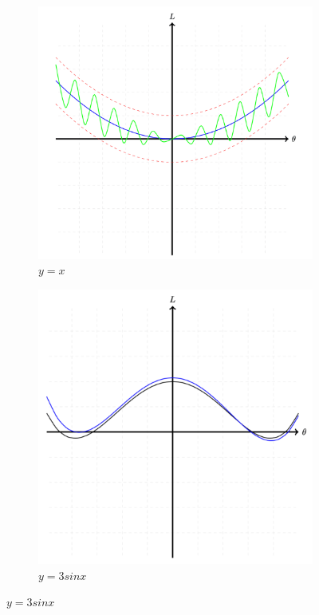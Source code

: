 \documentclass{article}
\begin{document}
\begin{figure}
     \centering
     \begin{subfigure}[b]{0.47\textwidth}
         \centering
         \includegraphics[width=\textwidth]{Figs/1.png}
         \caption{$y=x$}
         \label{fig:1}
     \end{subfigure}
     \hfill
     \begin{subfigure}[b]{0.47\textwidth}
         \centering
         \includegraphics[width=\textwidth]{Figs/2.png}
         \caption{$y=3sinx$}
         \label{fig:2}
     \end{subfigure}
\end{figure}
\end{document}
